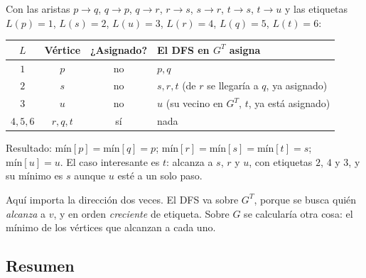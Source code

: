 \documentclass[11pt,letterpaper]{article}
\begin{document}
\begin{ejemplo}
  \label{ej:minimos-alcanzables}
  Con las aristas $p \to q$, $q \to p$, $q \to r$, $r \to s$,
  $s \to r$, $t \to s$, $t \to u$ y las etiquetas $L(p) = 1$,
  $L(s) = 2$, $L(u) = 3$, $L(r) = 4$, $L(q) = 5$, $L(t) = 6$:
  \begin{center}
  \small
  \begin{tabular}{cccl}
    \toprule
    $L$ & \textbf{Vértice} & \textbf{¿Asignado?}
      & \textbf{El DFS en $G^T$ asigna} \\
    \midrule
    $1$ & $p$ & no & $p, q$ \\
    $2$ & $s$ & no & $s, r, t$ (de $r$ se llegaría a $q$, ya
      asignado) \\
    $3$ & $u$ & no & $u$ (su vecino en $G^T$, $t$, ya está
      asignado) \\
    $4, 5, 6$ & $r, q, t$ & sí & nada \\
    \bottomrule
  \end{tabular}
  \end{center}
  Resultado: $\text{mín}[p] = \text{mín}[q] = p$;
  $\text{mín}[r] = \text{mín}[s] = \text{mín}[t] = s$;
  $\text{mín}[u] = u$. El caso interesante es $t$: alcanza a $s$, $r$
  y $u$, con etiquetas $2$, $4$ y $3$, y su mínimo es $s$ aunque $u$
  esté a un solo paso.
\end{ejemplo}

\begin{ojo}
  Aquí importa la dirección dos veces. El DFS va sobre $G^T$, porque se
  busca quién \emph{alcanza} a $v$, y en orden \emph{creciente} de
  etiqueta. Sobre $G$ se calcularía otra cosa: el mínimo de los
  vértices que alcanzan a cada uno.
\end{ojo}


\subsection*{Resumen}
\end{document}
